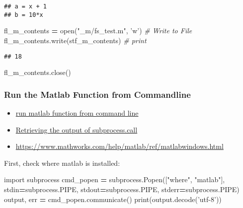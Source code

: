 \documentclass[
]{book}
\newenvironment{Shaded}{\begin{snugshade}}{\end{snugshade}}
\newcommand{\BuiltInTok}[1]{#1}
\newcommand{\CommentTok}[1]{\textcolor[rgb]{0.56,0.35,0.01}{\textit{#1}}}
\newcommand{\ImportTok}[1]{#1}
\newcommand{\NormalTok}[1]{#1}
\newcommand{\OperatorTok}[1]{\textcolor[rgb]{0.81,0.36,0.00}{\textbf{#1}}}
\newcommand{\StringTok}[1]{\textcolor[rgb]{0.31,0.60,0.02}{#1}}
\providecommand{\tightlist}{%
  \setlength{\itemsep}{0pt}\setlength{\parskip}{0pt}}
\begin{document}
\begin{verbatim}
## a = x + 1
## b = 10*x
\end{verbatim}

\begin{Shaded}
\begin{Highlighting}[]
\NormalTok{fl_m_contents }\OperatorTok{=} \BuiltInTok{open}\NormalTok{(}\StringTok{"_m/fs_test.m"}\NormalTok{, }\StringTok{'w'}\NormalTok{)}
\CommentTok{# Write to File}
\NormalTok{fl_m_contents.write(stf_m_contents)}
\CommentTok{# print}
\end{Highlighting}
\end{Shaded}

\begin{verbatim}
## 18
\end{verbatim}

\begin{Shaded}
\begin{Highlighting}[]
\NormalTok{fl_m_contents.close()}
\end{Highlighting}
\end{Shaded}

\hypertarget{run-the-matlab-function-from-commandline}{%
\subsubsection{Run the Matlab Function from Commandline}\label{run-the-matlab-function-from-commandline}}

\begin{itemize}
\tightlist
\item
  \href{https://www.mathworks.com/matlabcentral/answers/327116-run-function-from-command-line}{run matlab function from command line}
\item
  \href{https://stackoverflow.com/a/1996540/8280804}{Retrieving the output of subprocess.call}
\item
  \url{https://www.mathworks.com/help/matlab/ref/matlabwindows.html}
\end{itemize}

First, check where matlab is installed:

\begin{Shaded}
\begin{Highlighting}[]
\ImportTok{import}\NormalTok{ subprocess}
\NormalTok{cmd_popen }\OperatorTok{=}\NormalTok{ subprocess.Popen([}\StringTok{"where"}\NormalTok{, }\StringTok{"matlab"}\NormalTok{],}
\NormalTok{                             stdin}\OperatorTok{=}\NormalTok{subprocess.PIPE,}
\NormalTok{                             stdout}\OperatorTok{=}\NormalTok{subprocess.PIPE,}
\NormalTok{                             stderr}\OperatorTok{=}\NormalTok{subprocess.PIPE)}
\NormalTok{output, err }\OperatorTok{=}\NormalTok{ cmd_popen.communicate()}
\BuiltInTok{print}\NormalTok{(output.decode(}\StringTok{'utf-8'}\NormalTok{))}
\end{Highlighting}
\end{Shaded}
\end{document}
